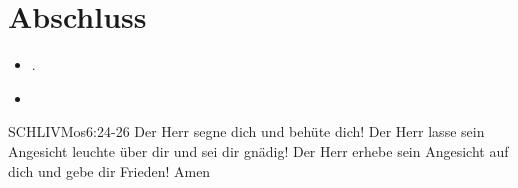 \documentclass[fontsize=16pt]{mybib}
\begin{document}
\section{Abschluss}
\begin{itemize}
    \item {}.
    \item {}
\end{itemize}
\begin{bibelbox}{SCHL}{IVMos}{6:24-26}
    Der Herr segne dich und behüte dich!
    Der Herr lasse sein Angesicht leuchte über dir 
    und sei dir gnädig!
    Der Herr erhebe sein Angesicht auf dich
    und gebe dir Frieden! Amen
\end{bibelbox}
\end{document}
